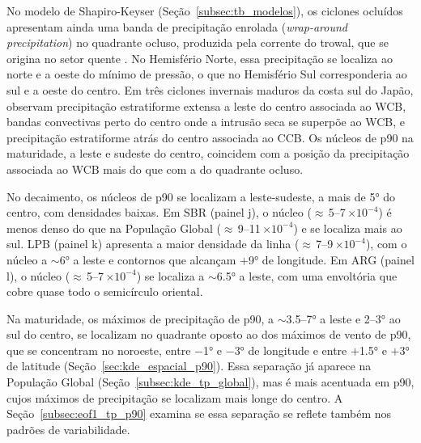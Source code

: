 
No modelo de Shapiro-Keyser (Seção~\ref{subsec:tb_modelos}), os ciclones ocluídos apresentam ainda uma banda de precipitação enrolada (\textit{wrap-around precipitation}) no quadrante ocluso, produzida pela corrente do trowal, que se origina no setor quente \citep{martin1999forcing}. No Hemisfério Norte, essa precipitação se localiza ao norte e a oeste do mínimo de pressão, o que no Hemisfério Sul corresponderia ao sul e a oeste do centro. Em três ciclones invernais maduros da costa sul do Japão, \citet{sawada2021heavy} observam precipitação estratiforme extensa a leste do centro associada ao WCB, bandas convectivas perto do centro onde a intrusão seca se superpõe ao WCB, e precipitação estratiforme atrás do centro associada ao CCB. Os núcleos de p90 na maturidade, a leste e sudeste do centro, coincidem com a posição da precipitação associada ao WCB mais do que com a do quadrante ocluso.

No decaimento, os núcleos de p90 se localizam a leste-sudeste, a mais de 5° do centro, com densidades baixas. Em SBR (painel j), o núcleo (${\approx}$\,5--7\,$\times10^{-4}$) é menos denso do que na População Global (${\approx}$\,9--11\,$\times10^{-4}$) e se localiza mais ao sul. LPB (painel k) apresenta a maior densidade da linha (${\approx}$\,7--9\,$\times10^{-4}$), com o núcleo a ${\sim}$6° a leste e contornos que alcançam $+$9° de longitude. Em ARG (painel l), o núcleo (${\approx}$\,5--7\,$\times10^{-4}$) se localiza a ${\sim}$6.5° a leste, com uma envoltória que cobre quase todo o semicírculo oriental.

Na maturidade, os máximos de precipitação de p90, a ${\sim}$3.5--7° a leste e 2--3° ao sul do centro, se localizam no quadrante oposto ao dos máximos de vento de p90, que se concentram no noroeste, entre $-$1° e $-$3° de longitude e entre $+$1.5° e $+$3° de latitude (Seção~\ref{sec:kde_espacial_p90}). Essa separação já aparece na População Global (Seção~\ref{subsec:kde_tp_global}), mas é mais acentuada em p90, cujos máximos de precipitação se localizam mais longe do centro. A Seção~\ref{subsec:eof1_tp_p90} examina se essa separação se reflete também nos padrões de variabilidade.
